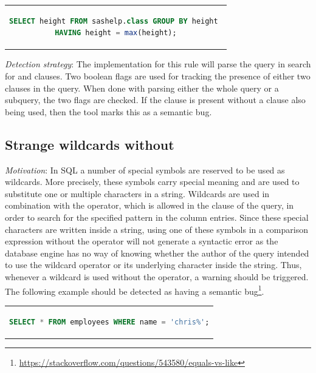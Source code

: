 \begin{center}
\begin{tabular}{c}
\begin{lstlisting}[language=SQL]
SELECT height FROM sashelp.class GROUP BY height 
HAVING height = max(height);
\end{lstlisting}
\end{tabular}
\end{center}

\noindent \emph{Detection strategy}: The implementation for this rule will parse the query in search for  and  clauses. Two boolean flags are used for tracking the presence of either two clauses in the query. When done with parsing either the whole query or a subquery, the two flags are checked. If the  clause is present without a  clause also being used, then the tool marks this as a semantic bug.

\subsection{Strange wildcards without }
\emph{Motivation}: In SQL a number of special symbols are reserved to be used as wildcards. More precisely, these symbols carry special meaning and are used to substitute one or multiple characters in a string. Wildcards are used in combination with the  operator, which is allowed in the  clause of the query, in order to search for the specified pattern in the column entries. Since these special characters are written inside a string, using one of these symbols in a comparison expression without the  operator will not generate a syntactic error as the database engine has no way of knowing whether the author of the query intended to use the wildcard operator or its underlying character inside the string. Thus, whenever a wildcard is used without the  operator, a warning should be triggered. The following example should be detected as having a semantic bug\footnote{\url{https://stackoverflow.com/questions/543580/equals-vs-like}}.

\begin{center}
\begin{tabular}{c}
\begin{lstlisting}[language=SQL]
SELECT * FROM employees WHERE name = 'chris%';
\end{lstlisting}
\end{tabular}
\end{center}


